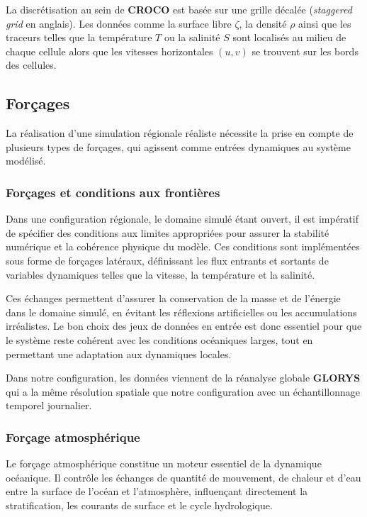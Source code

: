 La discrétisation au sein de \textbf{CROCO} est basée sur une grille décalée (\textit{staggered grid} en anglais). Les données comme la surface libre $\zeta$, la densité $\rho$ ainsi que les traceurs telles que la température $T$ ou la salinité $S$ sont localisés au milieu de chaque cellule alors que les vitesses horizontales $(u,v)$ se trouvent sur les bords des cellules.


\subsection{Forçages}

La réalisation d’une simulation régionale réaliste nécessite la prise en compte de plusieurs types de forçages, qui agissent comme entrées dynamiques au système modélisé.

\subsubsection{Forçages et conditions aux frontières}

Dans une configuration régionale, le domaine simulé étant ouvert, il est impératif de spécifier des conditions aux limites appropriées pour assurer la stabilité numérique et la cohérence physique du modèle. Ces conditions sont implémentées sous forme de forçages latéraux, définissant les flux entrants et sortants de variables dynamiques telles que la vitesse, la température et la salinité.

Ces échanges permettent d’assurer la conservation de la masse et de l’énergie dans le domaine simulé, en évitant les réflexions artificielles ou les accumulations irréalistes. Le bon choix des jeux de données en entrée est donc essentiel pour que le système reste cohérent avec les conditions océaniques larges, tout en permettant une adaptation aux dynamiques locales.

Dans notre configuration, les données viennent de la réanalyse globale \textbf{GLORYS} \cite{european_union-copernicus_marine_service_global_2018} qui a la même résolution spatiale que notre configuration avec un échantillonnage temporel journalier.

\subsubsection{Forçage atmosphérique}

Le forçage atmosphérique constitue un moteur essentiel de la dynamique océanique. Il contrôle les échanges de quantité de mouvement, de chaleur et d’eau entre la surface de l’océan et l’atmosphère, influençant directement la stratification, les courants de surface et le cycle hydrologique.

